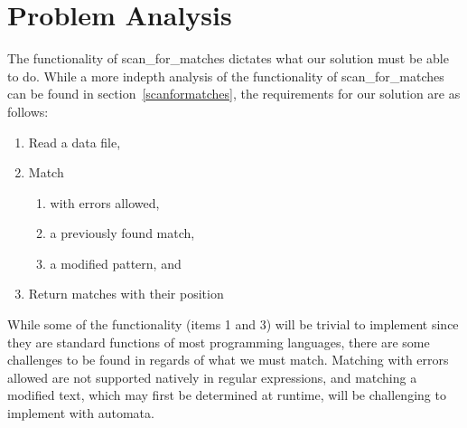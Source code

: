 \section{Problem Analysis}\label{probanal}
The functionality of scan\_for\_matches dictates what our solution must be able to do. While a more indepth analysis of the functionality 
of scan\_for\_matches can be found in section~\ref{scanformatches}, 
the requirements for our solution are as follows:
\begin{enumerate}
\item Read a data file,
\item Match
\begin{enumerate}
\item with errors allowed,
\item a previously found match,
\item a modified pattern, and
\end{enumerate}
\item Return matches with their position
\end{enumerate}
While some of the functionality (items 1 and 3) will be trivial to implement 
since they are standard functions of most programming languages, there are 
some challenges to be found in regards of what we must match. Matching with 
errors allowed are not supported natively in regular expressions, and 
matching a modified text, which may first be determined at runtime, will be 
challenging to implement with automata.

